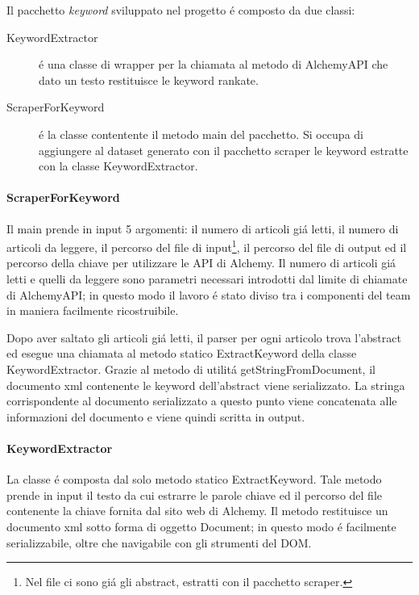 \documentclass[11pt,twoside,a4paper]{article}
\begin{document}
Il pacchetto \emph{keyword} sviluppato nel progetto \'e composto da due classi:
\begin{description}
	\item[KeywordExtractor] \'e una classe di wrapper per la chiamata al metodo di AlchemyAPI che dato un testo restituisce le keyword rankate.
	\item[ScraperForKeyword] \'e la classe contentente il metodo main del pacchetto. Si occupa di aggiungere al dataset generato con il pacchetto scraper le keyword estratte con la classe KeywordExtractor.
\end{description}

\paragraph{ScraperForKeyword}
\label{par:scraperforkeyword}



Il main prende in input 5 argomenti: il numero di articoli gi\'a letti, il numero di articoli da leggere, il percorso del file di input\footnote{Nel file ci sono gi\'a gli abstract, estratti con il pacchetto scraper.}, il percorso del file di output ed il percorso della chiave per utilizzare le API di Alchemy. Il numero di articoli gi\'a letti e quelli da leggere sono parametri necessari introdotti dal limite di chiamate di AlchemyAPI; in questo modo il lavoro \'e stato diviso tra i componenti del team in maniera facilmente ricostruibile.

Dopo aver saltato gli articoli gi\'a letti, il parser per ogni articolo trova l'abstract ed esegue una chiamata al metodo statico ExtractKeyword della classe KeywordExtractor. Grazie al metodo di utilit\'a getStringFromDocument, il documento xml contenente le keyword dell'abstract viene serializzato. La stringa corrispondente al documento serializzato a questo punto viene concatenata alle informazioni del documento e viene quindi scritta in output.

\paragraph{KeywordExtractor}
\label{par:keywordextractor}
La classe \'e composta dal solo metodo statico ExtractKeyword. Tale metodo prende in input il testo da cui estrarre le parole chiave ed il percorso del file contenente la chiave fornita dal sito web di Alchemy. Il metodo restituisce un documento xml sotto forma di oggetto Document; in questo modo \'e facilmente serializzabile, oltre che navigabile con gli strumenti del DOM.
\end{document}

